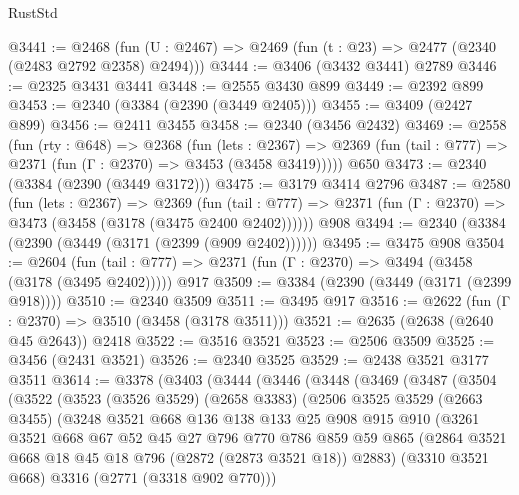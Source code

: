 \begin{lexlean}{RustStd}
\begin{coremodule}
@3441 := @2468 (fun (U : @2467) => @2469 (fun (t : @23) => @2477 (@2340 (@2483 @2792 @2358) @2494)))
@3444 := @3406 (@3432 @3441) @2789
@3446 := @2325 @3431 @3441
@3448 := @2555 @3430 @899
@3449 := @2392 @899
@3453 := @2340 (@3384 (@2390 (@3449 @2405)))
@3455 := @3409 (@2427 @899)
@3456 := @2411 @3455
@3458 := @2340 (@3456 @2432)
@3469 := @2558
    (fun (rty : @648) =>
    @2368
      (fun (lets : @2367) =>
      @2369 (fun (tail : @777) => @2371 (fun (Γ : @2370) => @3453 (@3458 @3419)))))
    @650
@3473 := @2340 (@3384 (@2390 (@3449 @3172)))
@3475 := @3179 @3414 @2796
@3487 := @2580
    (fun (lets : @2367) =>
    @2369
      (fun (tail : @777) => @2371 (fun (Γ : @2370) => @3473 (@3458 (@3178 (@3475 @2400 @2402))))))
    @908
@3494 := @2340 (@3384 (@2390 (@3449 (@3171 (@2399 (@909 @2402))))))
@3495 := @3475 @908
@3504 := @2604
    (fun (tail : @777) => @2371 (fun (Γ : @2370) => @3494 (@3458 (@3178 (@3495 @2402)))))
    @917
@3509 := @3384 (@2390 (@3449 (@3171 (@2399 @918))))
@3510 := @2340 @3509
@3511 := @3495 @917
@3516 := @2622 (fun (Γ : @2370) => @3510 (@3458 (@3178 @3511)))
@3521 := @2635 (@2638 (@2640 @45 @2643)) @2418
@3522 := @3516 @3521
@3523 := @2506 @3509
@3525 := @3456 (@2431 @3521)
@3526 := @2340 @3525
@3529 := @2438 @3521 @3177 @3511
@3614 := @3378
    (@3403
      (@3444
        (@3446
          (@3448
            (@3469
              (@3487
                (@3504
                  (@3522
                    (@3523
                      (@3526 @3529)
                      (@2658 @3383)
                      (@2506
                        @3525
                        @3529
                        (@2663 @3455)
                        (@3248
                          @3521
                          @668
                          @136
                          @138
                          @133
                          @25
                          @908
                          @915
                          @910
                          (@3261
                            @3521
                            @668
                            @67
                            @52
                            @45
                            @27
                            @796
                            @770
                            @786
                            @859
                            @59
                            @865
                            (@2864 @3521 @668 @18 @45 @18 @796 (@2872 (@2873 @3521 @18)) @2883)
                            (@3310 @3521 @668)
                            @3316
                            (@2771 (@3318 @902 @770)))

\end{coremodule}
\end{lexlean}
